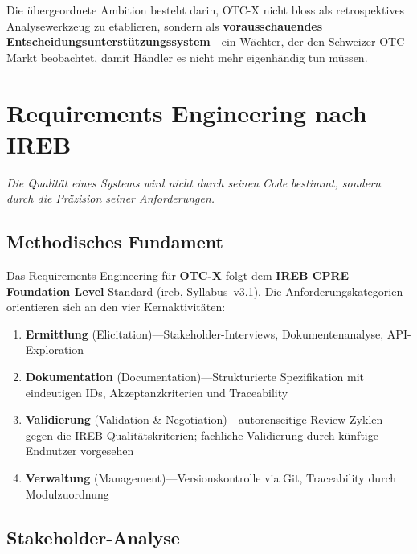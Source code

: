 \documentclass[11pt, a4paper, oneside, openany]{report}
\newcommand{\term}[1]{\textcolor{SwissRed}{\sffamily\textbf{#1}}}
\begin{document}
\begin{insightbox}
Die übergeordnete Ambition besteht darin, OTC-X nicht bloss als retrospektives Analysewerkzeug zu etablieren, sondern als \textbf{vorausschauendes Entscheidungsunterstützungssystem}\;---\;ein Wächter, der den Schweizer OTC-Markt beobachtet, damit Händler es nicht mehr eigenhändig tun müssen.
\end{insightbox}


\chapter{Requirements Engineering nach IREB}
\label{ch:requirements}

\epigraph{\itshape Die Qualität eines Systems wird nicht durch seinen Code bestimmt, sondern durch die Präzision seiner Anforderungen.}{}

\section{Methodisches Fundament}

Das Requirements Engineering für \term{OTC-X} folgt dem \textbf{IREB CPRE Foundation Level}-Standard (\gls{ireb}, Syllabus~v3.1). Die Anforderungskategorien orientieren sich an den vier Kernaktivitäten:

\begin{enumerate}[label=\textcolor{SwissRed}{\textbf{\arabic*.}}]
  \item \textbf{Ermittlung} (Elicitation)\;---\;Stakeholder-Interviews, Dokumentenanalyse, API-Exploration
  \item \textbf{Dokumentation} (Documentation)\;---\;Strukturierte Spezifikation mit eindeutigen IDs, Akzeptanzkriterien und Traceability
  \item \textbf{Validierung} (Validation \& Negotiation)\;---\;autorenseitige Review-Zyklen gegen die IREB-Qualitätskriterien; fachliche Validierung durch künftige Endnutzer vorgesehen
  \item \textbf{Verwaltung} (Management)\;---\;Versionskontrolle via Git, Traceability durch Modulzuordnung
\end{enumerate}

\section{Stakeholder-Analyse}
\end{document}
